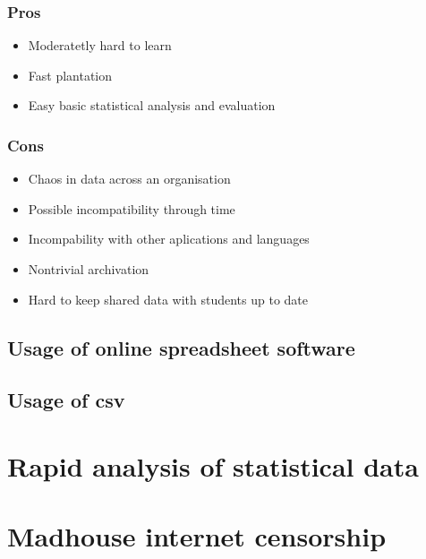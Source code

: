 \subsubsection{Pros}
\begin{itemize}
\item Moderatetly hard to learn
\item Fast plantation
\item Easy basic statistical analysis and evaluation
\end{itemize}

\subsubsection{Cons}
\begin{itemize}
\item Chaos in data across an organisation
\item Possible incompatibility through time
\item Incompability with other aplications and languages
\item Nontrivial archivation
\item Hard to keep shared data with students up to date
\end{itemize}

\subsection{Usage of online spreadsheet software}
\subsection{Usage of csv}


\section{Rapid analysis of statistical data}

\section{Madhouse internet censorship}
